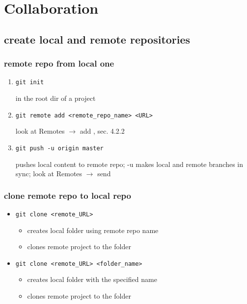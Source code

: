 \documentclass{report}
\begin{document}
\section{Collaboration}
\subsection{create local and remote repositories}
\subsubsection{remote repo from local one}

\begin{enumerate}
\item \begin{verbatim}
git init
\end{verbatim}
in the root dir of a project
\item \begin{verbatim}
git remote add <remote_repo_name> <URL>
\end{verbatim}
look at Remotes $\rightarrow$ add
, sec. 4.2.2
\item \begin{verbatim}
git push -u origin master
\end{verbatim}
pushes local content to remote repo; -u makes local and remote branches in sync; look at Remotes $\rightarrow$ send
\end{enumerate}

\subsubsection{clone remote repo to local repo}
\begin{itemize}
\item \begin{verbatim}
git clone <remote_URL>
\end{verbatim}
\begin{itemize}

\item creates local folder using remote repo name

\item clones remote project to the folder
\end{itemize}

\item \begin{verbatim}
git clone <remote_URL> <folder_name>
\end{verbatim}

\begin{itemize}
\item creates local folder with the specified name

\item clones remote project to the folder
\end{itemize}
\end{itemize}
\end{document}

